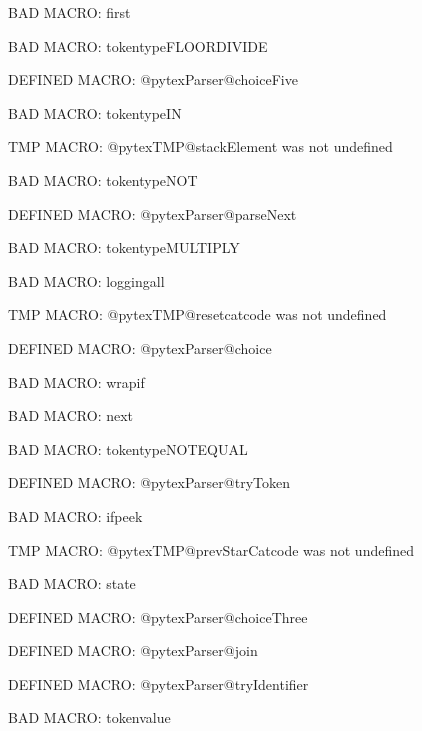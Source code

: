 BAD MACRO: first

BAD MACRO: tokentypeFLOORDIVIDE

\ifx\@pytexParser@choiceFive\undefined\else DEFINED MACRO: @pytexParser@choiceFive
\fi

BAD MACRO: tokentypeIN

\ifx\@pytexTMP@stackElement\undefined\else TMP MACRO: @pytexTMP@stackElement was not undefined
\fi

BAD MACRO: tokentypeNOT

\ifx\@pytexParser@parseNext\undefined\else DEFINED MACRO: @pytexParser@parseNext
\fi

BAD MACRO: tokentypeMULTIPLY

BAD MACRO: loggingall

\ifx\@pytexTMP@resetcatcode\undefined\else TMP MACRO: @pytexTMP@resetcatcode was not undefined
\fi

\ifx\@pytexParser@choice\undefined\else DEFINED MACRO: @pytexParser@choice
\fi

BAD MACRO: wrapif

BAD MACRO: next

BAD MACRO: tokentypeNOTEQUAL

\ifx\@pytexParser@tryToken\undefined\else DEFINED MACRO: @pytexParser@tryToken
\fi

BAD MACRO: ifpeek

\ifx\@pytexTMP@prevStarCatcode\undefined\else TMP MACRO: @pytexTMP@prevStarCatcode was not undefined
\fi

BAD MACRO: state

\ifx\@pytexParser@choiceThree\undefined\else DEFINED MACRO: @pytexParser@choiceThree
\fi

\ifx\@pytexParser@join\undefined\else DEFINED MACRO: @pytexParser@join
\fi

\ifx\@pytexParser@tryIdentifier\undefined\else DEFINED MACRO: @pytexParser@tryIdentifier
\fi

BAD MACRO: tokenvalue

